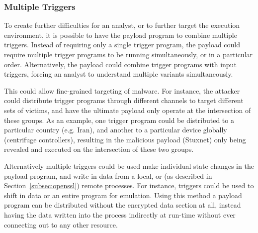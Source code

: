 \subsubsection{Multiple Triggers}
To create further difficulties for an analyst, or to further target the
execution environment, it is possible to have the payload program to combine
multiple triggers. Instead of requiring only a single trigger program, the
payload could require multiple trigger programs to be running simultaneously, or
in a particular order. Alternatively, the payload could combine trigger programs
with input triggers, forcing an analyst to understand multiple variants
simultaneously.

This could allow fine-grained targeting of malware. For instance, the attacker
could distribute trigger programs through different channels to target different
sets of victims, and have the ultimate payload only operate at the intersection
of these groups. As an example, one trigger program could be distributed to a
particular country (e.g. Iran), and another to a particular device globally
(centrifuge controllers), resulting in the malicious payload (Stuxnet) only
being revealed and executed on the intersection of these two groups.


\smallskip

Alternatively multiple triggers could be used make individual state changes in
the payload program, and write in data from a local, or (as described in
Section~\ref{subsec:openssl}) remote processes. For instance, triggers could be
used to shift in data or an entire program for emulation.
Using this method a payload program can be distributed without the encrypted
data section at all, instead having the data written into the process indirectly
at run-time without ever connecting out to any other resource.

